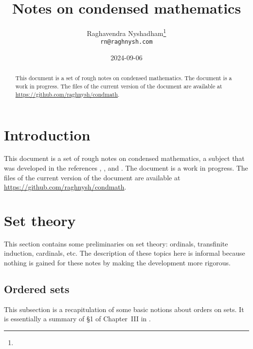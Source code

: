 \documentclass{article}
\title{Notes on condensed mathematics}
\author{Raghavendra Nyshadham\thanks{\cczero} \\
  {\normalsize\nolinkurl{rn@raghnysh.com}}}
\date{2024-09-06}
\begin{document}
\begin{titlingpage}
  \maketitle

  \begin{abstract}
    This document is a set of rough notes on condensed mathematics.
    The document is a work in progress.  The files of the current
    version of the document are available at
    \url{https://github.com/raghnysh/condmath}.


  \end{abstract}
\end{titlingpage}

\tableofcontents

\section{Introduction}
\label{sec:113nrd0o}

This document is a set of rough notes on condensed mathematics, a
subject that was developed in the references \textcite{bib:872u2noz},
\textcite{bib:iy49ytm3}, and \textcite{bib:7k2n4jtn}.  The document is
a work in progress.  The files of the current version of the document
are available at \url{https://github.com/raghnysh/condmath}.

\section{Set theory}
\label{sec:pafnta4o}

This section contains some preliminaries on set theory: ordinals,
transfinite induction, cardinals, etc.  The description of these
topics here is informal because nothing is gained for these notes by
making the development more rigorous.

\subsection{Ordered sets}
\label{sec:5f3q5o8v}

This subsection is a recapitulation of some basic notions about orders
on sets.  It is essentially a summary of \S1 of Chapter~III in
\textcite{bib:lmhdqwpw}.
\end{document}
